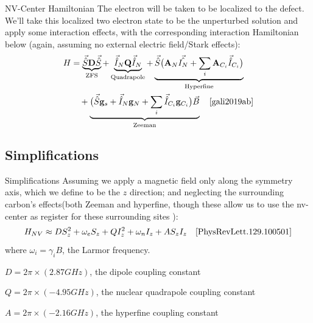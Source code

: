 \documentclass[11pt]{beamer}
\begin{document}
\begin{frame}{NV-Center Hamiltonian}
The electron will be taken to be localized to the defect. We'll take this localized two electron state to be the unperturbed solution and apply some interaction effects, with the corresponding interaction Hamiltonian below (again, assuming no external electric field/Stark effects):
\begin{align*}
H&=\underbrace{\vec{\hat{S}}\mathbf{D}\vec{\hat{S}}}_{\text{ZFS}} +   \underbrace{\vec{\hat{I}}_N\mathbf{Q} \vec{\hat{I}}_N}_{\text{Quadrapole}}+\underbrace{\vec{\hat{S}}\big(\mathbf{A}_N\vec{\hat{I_N}}+\sum_i\mathbf{A}_{C_i}\vec{\hat{I}}_{C_i}\big)}_{\text{Hyperfine}}\\
&\quad +\underbrace{\big(\vec{\hat{S}}\mathbf{g}_s+\vec{\hat{I}}_N\mathbf{g}_N+\sum_i\vec{\hat{I}}_{C_i}\mathbf{g}_{C_i}\big)\vec{B}}_{\text{Zeeman}}\quad\cite{gali2019ab}\\
\end{align*}
\end{frame}
\subsection{Simplifications}
\begin{frame}{Simplifications}
Assuming we apply a magnetic field only along the symmetry axis, which we define to be the $z$ direction\pause ; and neglecting the surrounding carbon's effects(both Zeeman and hyperfine, though these allow us to use the nv-center as register for these surrounding sites \cite{PhysRevX.9.031045}):\pause
$$
H_{NV}\approx DS_z^2 + \omega_eS_z + QI_z^2 +\omega_nI_z + AS_zI_z\quad\cite{PhysRevLett.129.100501}
$$
where $\omega_i = \gamma_i B$, the Larmor frequency. 

$D=2\pi\times (2.87 GHz)$, the dipole coupling constant

$Q=2\pi\times (-4.95 GHz)$, the nuclear quadrapole coupling constant

$A=2\pi\times (-2.16 GHz)$, the hyperfine coupling constant

\end{frame}
\end{document}
